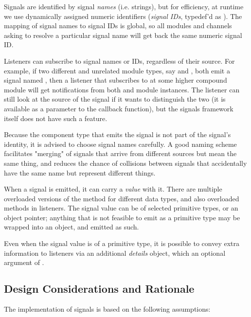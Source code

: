 Signals are identified by signal \textit{names} (i.e. strings), but for efficiency,
at runtime we use dynamically assigned numeric identifiers (\textit{signal IDs},
typedef'd as ). The mapping of signal names to signal IDs is
global, so all modules and channels asking to resolve a particular signal name
will get back the same numeric signal ID.

Listeners can subscribe to signal names or IDs, regardless of their
source. For example, if two different and unrelated module types, say
 and , both emit a signal named , then
a listener that subscribes to  at some higher compound module
will get notifications from both  and  module
instances. The listener can still look at the source of the signal if it
wants to distinguish the two (it is available as a parameter to the
callback function), but the signals framework itself does not have such a
feature.

\begin{note}
  Because the component type that emits the signal is not part of the signal's
  identity, it is advised to choose signal names carefully. A good naming scheme
  facilitates "merging" of signals that arrive from different sources but
  mean the same thing, and reduces the chance of collisions between signals that
  accidentally have the same name but represent different things.
\end{note}

When a signal is emitted, it can carry a \textit{value} with it. There are
multiple overloaded versions of the  method for different
data types, and also overloaded  methods in
listeners. The signal value can be of selected primitive types, or an
object pointer; anything that is not feasible to emit as a primitive type
may be wrapped into an object, and emitted as such.

Even when the signal value is of a primitive type, it is possible to convey
extra information to listeners via an additional \textit{details} object,
which an optional argument of .


\subsection{Design Considerations and Rationale}
\label{sec:simple-modules:signals-design}

The implementation of signals is based on the following assumptions:

